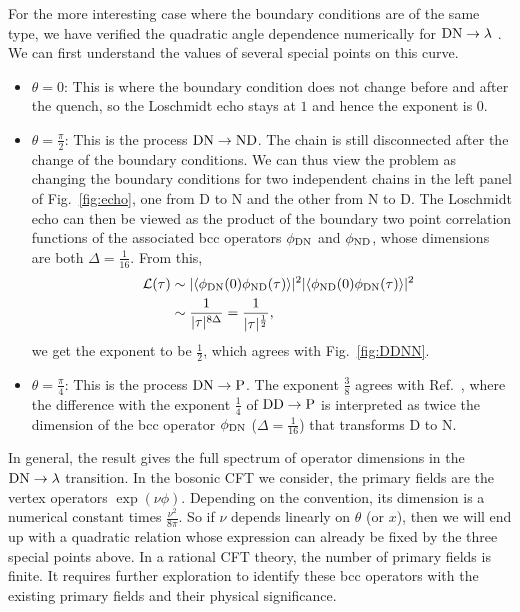 For the more interesting case where the boundary conditions are of the same type, we have verified the quadratic angle dependence numerically for ${\rm DN} \rightarrow \lambda$ {\iffalse \color{red}the process in Eq.~\eqref{eq:DNDN}.\fi}. We can first understand the values of several special points on this curve. 
\begin{itemize}
\item $\theta = 0$: This is where the boundary condition does not change before and after the quench, so the Loschmidt echo stays at $1$ and hence the exponent is $0$.
\item $\theta = \frac{\pi}{2}$: This is the process ${\rm DN}\rightarrow {\rm  ND}$. The chain is still disconnected after the change of the boundary conditions. We can thus view the problem as changing the boundary conditions for two independent chains in the left panel of Fig.~\ref{fig:echo}, one from D to N and the other from N to D. The Loschmidt echo can then be viewed as the product of the boundary two point correlation functions of the associated bcc operators $\phi_{\rm DN}$ and $\phi_{\rm ND}$, whose dimensions are both $\Delta = \frac{1}{16}$. From this,
\begin{equation}
\begin{aligned}
  \quad \mathcal{L}(\tau) &\sim |\langle \phi_{{\rm D N}}(0) \phi_{{\rm ND}}(\tau)   \rangle |^2 
|\langle \phi_{{\rm ND}}(0)  \phi_{{\rm DN}}(\tau)   \rangle| ^2\\
& \sim \frac{1}{|\tau|^{8\Delta}} = \frac{1}{|\tau|^{\frac{1}{2}}},
\end{aligned}
\end{equation}
we get the exponent to be $\frac{1}{2}$, which agrees with Fig.~\ref{fig:DDNN}. 
\item $\theta = \frac{\pi}{4}$: This is the process ${\rm DN}\rightarrow {\rm P}$. The exponent $\frac{3}{8}$ agrees with Ref.~, where the difference with the exponent $\frac{1}{4}$ of ${\rm DD} \rightarrow {\rm P}$ is interpreted as twice the dimension of the bcc operator $\phi_{\rm DN}$ ($\Delta = \frac{1}{16}$) that transforms D to N.
\end{itemize}
In general, the result gives the full spectrum of operator dimensions in the ${\rm DN} \rightarrow \lambda $ transition. In the bosonic CFT we consider, the primary fields are the vertex operators $\exp( \nu \phi )$. Depending on the convention, its dimension is a numerical constant times $\frac{\nu^2}{8\pi}$. So if $\nu$ depends linearly on $\theta$ (or $x$), then we will end up with a quadratic relation whose expression can already be fixed by the three special points above. In a rational CFT theory, the number of primary fields is finite. It requires further exploration to identify these bcc operators with the existing primary fields and their physical significance. 

